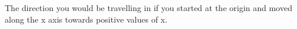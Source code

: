The direction you would be travelling in if you started at the
origin and moved along the x axis towards positive values of x.